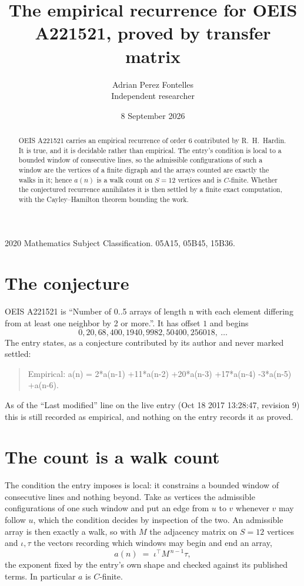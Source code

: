 \documentclass[11pt,a4paper]{article}
\title{The empirical recurrence for OEIS A221521, proved by transfer matrix}
\author{Adrian Perez Fontelles\\ \small Independent researcher}
\date{8 September 2026}
\theoremstyle{plain}
\theoremstyle{definition}
\begin{document}
\maketitle

\begin{abstract}
OEIS A221521 carries an empirical recurrence of order $6$ contributed by R.~H.~Hardin. It is
true, and it is decidable rather than empirical. The entry's condition is local to a bounded window of consecutive lines, so
the admissible configurations of such a window are the vertices of a finite digraph and the
arrays counted are exactly the walks in it; hence $a(n)$ is a walk count on $S=12$ vertices
and is $C$-finite. Whether the conjectured recurrence annihilates it is then settled by a
finite exact computation, with the Cayley--Hamilton theorem bounding the work.
\end{abstract}

\noindent\small 2020 Mathematics Subject Classification. 05A15, 05B45, 15B36.\normalsize

\section{The conjecture}

OEIS A221521 is ``Number of 0..5 arrays of length n with each element differing from at least one neighbor by 2 or more.''. It has offset $1$ and begins
\[
0, 20, 68, 400, 1940, 9982, 50400, 256018,\ \dots
\]
The entry states, as a conjecture contributed by its author and never marked settled:
\begin{quote}
Empirical: a(n) = 2*a(n-1) +11*a(n-2) +20*a(n-3) +17*a(n-4) -3*a(n-5) +a(n-6).
\end{quote}
As of the ``Last modified'' line on the live entry (Oct 18 2017 13:28:47, revision 9) this is still
recorded as empirical, and nothing on the entry records it as proved.

\section{The count is a walk count}

The condition the entry imposes is local: it constrains a bounded window of consecutive lines and nothing beyond. Take as
vertices the admissible configurations of one such window and put an edge from $u$ to $v$
whenever $v$ may follow $u$, which the condition decides by inspection of the two. An
admissible array is then exactly a walk, so with $M$ the adjacency matrix on $S=12$ vertices
and $\iota,\tau$ the vectors recording which windows may begin and end an array,
\[
a(n)\;=\;\iota^{\!\top}M^{\,n-1}\tau ,
\]
the exponent fixed by the entry's own shape and checked against its published terms. In
particular $a$ is $C$-finite.
\end{document}
